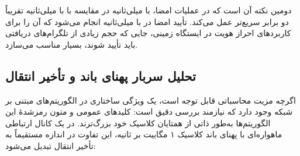 \documentclass[a4paper,14pt]{extreport}
\begin{document}
دومین نکته آن است که در عملیات امضا،  با  میلی‌ثانیه در مقایسه با  با  میلی‌ثانیه تقریباً دو برابر سریع‌تر عمل می‌کند. تأیید امضا در  با  میلی‌ثانیه انجام می‌شود که آن را برای کاربردهای احراز هویت در ایستگاه زمینی، جایی که حجم زیادی از تلگرام‌های دریافتی باید تأیید شوند، بسیار مناسب می‌سازد.

\subsection{تحلیل سربار پهنای باند و تأخیر انتقال}

اگرچه مزیت محاسباتی  قابل توجه است، یک ویژگی ساختاری در الگوریتم‌های مبتنی بر شبکه وجود دارد که نیازمند بررسی دقیق است: کلیدهای عمومی و متون رمزشدهٔ  این الگوریتم‌ها به‌طور ذاتی از همتایان کلاسیک خود بزرگ‌ترند. در یک کانال ارتباطی ماهواره‌ای با پهنای باند کلاسیک ۱ مگابیت بر ثانیه، این تفاوت در اندازه مستقیماً به تأخیر انتقال  تبدیل می‌شود:
\end{document}
